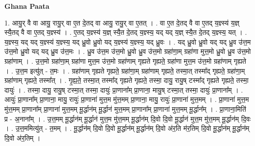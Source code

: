 \documentclass[17pt]{extarticle}
\begin{document}
\textbf{Ghana Paata } \newline

1. आयु॒र् वै वा आयु॒ रायु॒र् वा ए॒त दे॒तद् वा आयु॒ रायु॒र् वा ए॒तत् । . वा ए॒त दे॒तद् वै वा ए॒तद् य॒ज्ञ्स्य॑ य॒ज्ञ् स्यै॒तद् वै वा ए॒तद् य॒ज्ञ्स्य॑ । . ए॒तद् य॒ज्ञ्स्य॑ य॒ज्ञ् स्यै॒त दे॒तद् य॒ज्ञ्स्य॒ यद् यद् य॒ज्ञ् स्यै॒त दे॒तद् य॒ज्ञ्स्य॒ यत् । . य॒ज्ञ्स्य॒ यद् यद् य॒ज्ञ्स्य॑ य॒ज्ञ्स्य॒ यद् ध्रु॒वो ध्रु॒वो यद् य॒ज्ञ्स्य॑ य॒ज्ञ्स्य॒ यद् ध्रु॒वः । . यद् ध्रु॒वो ध्रु॒वो यद् यद् ध्रु॒व उ॑त्त॒म उ॑त्त॒मो ध्रु॒वो यद् यद् ध्रु॒व उ॑त्त॒मः । . ध्रु॒व उ॑त्त॒म उ॑त्त॒मो ध्रु॒वो ध्रु॒व उ॑त्त॒मो ग्रहा॑णा॒म् ग्रहा॑णा मुत्त॒मो ध्रु॒वो ध्रु॒व उ॑त्त॒मो ग्रहा॑णाम् । . उ॒त्त॒मो ग्रहा॑णा॒म् ग्रहा॑णा मुत्त॒म उ॑त्त॒मो ग्रहा॑णाम् गृह्यते गृह्यते॒ ग्रहा॑णा मुत्त॒म उ॑त्त॒मो ग्रहा॑णाम् गृह्यते । . उ॒त्त॒म इत्यु॑त् - त॒मः । . ग्रहा॑णाम् गृह्यते गृह्यते॒ ग्रहा॑णा॒म् ग्रहा॑णाम् गृह्यते॒ तस्मा॒त् तस्मा᳚द् गृह्यते॒ ग्रहा॑णा॒म् ग्रहा॑णाम् गृह्यते॒ तस्मा᳚त् । . गृ॒ह्य॒ते॒ तस्मा॒त् तस्मा᳚द् गृह्यते गृह्यते॒ तस्मा॒ दायु॒ रायु॒ष् टस्मा᳚द् गृह्यते गृह्यते॒ तस्मा॒ दायुः॑ । . तस्मा॒ दायु॒ रायु॒ष् टस्मा॒त् तस्मा॒ दायुः॑ प्रा॒णाना᳚म् प्रा॒णाना॒ मायु॒ष् टस्मा॒त् तस्मा॒ दायुः॑ प्रा॒णाना᳚म् । . आयुः॑ प्रा॒णाना᳚म् प्रा॒णाना॒ मायु॒ रायुः॑ प्रा॒णाना॑ मुत्त॒म मु॑त्त॒मम् प्रा॒णाना॒ मायु॒ रायुः॑ प्रा॒णाना॑ मुत्त॒मम् । . प्रा॒णाना॑ मुत्त॒म मु॑त्त॒मम् प्रा॒णाना᳚म् प्रा॒णाना॑ मुत्त॒मम् मू॒र्द्धान॑म् मू॒र्द्धान॑ मुत्त॒मम् प्रा॒णाना᳚म् प्रा॒णाना॑ मुत्त॒मम् मू॒र्द्धान᳚म् । . प्रा॒णाना॒मिति॑ प्र - अ॒नाना᳚म् । . उ॒त्त॒मम् मू॒र्द्धान॑म् मू॒र्द्धान॑ मुत्त॒म मु॑त्त॒मम् मू॒र्द्धान॑म् दि॒वो दि॒वो मू॒र्द्धान॑ मुत्त॒म मु॑त्त॒मम् मू॒र्द्धान॑म् दि॒वः । . उ॒त्त॒ममित्यु॑त् - त॒मम् । . मू॒र्द्धान॑म् दि॒वो दि॒वो मू॒र्द्धान॑म् मू॒र्द्धान॑म् दि॒वो अ॑र॒ति म॑र॒तिम् दि॒वो मू॒र्द्धान॑म् मू॒र्द्धान॑म् दि॒वो अ॑र॒तिम् । \newline
\end{document}
